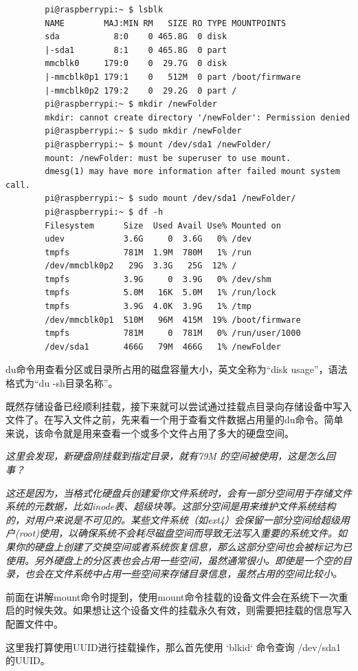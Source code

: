 \documentclass[UTF8]{article}
\begin{document}
	\begin{lstlisting}
		pi@raspberrypi:~ $ lsblk
		NAME        MAJ:MIN RM   SIZE RO TYPE MOUNTPOINTS
		sda           8:0    0 465.8G  0 disk
		|-sda1        8:1    0 465.8G  0 part
		mmcblk0     179:0    0  29.7G  0 disk
		|-mmcblk0p1 179:1    0   512M  0 part /boot/firmware
		|-mmcblk0p2 179:2    0  29.2G  0 part /
		pi@raspberrypi:~ $ mkdir /newFolder
		mkdir: cannot create directory '/newFolder': Permission denied
		pi@raspberrypi:~ $ sudo mkdir /newFolder
		pi@raspberrypi:~ $ mount /dev/sda1 /newFolder/
		mount: /newFolder: must be superuser to use mount.
		dmesg(1) may have more information after failed mount system call.
		pi@raspberrypi:~ $ sudo mount /dev/sda1 /newFolder/
		pi@raspberrypi:~ $ df -h
		Filesystem      Size  Used Avail Use% Mounted on
		udev            3.6G     0  3.6G   0% /dev
		tmpfs           781M  1.9M  780M   1% /run
		/dev/mmcblk0p2   29G  3.3G   25G  12% /
		tmpfs           3.9G     0  3.9G   0% /dev/shm
		tmpfs           5.0M   16K  5.0M   1% /run/lock
		tmpfs           3.9G  4.0K  3.9G   1% /tmp
		/dev/mmcblk0p1  510M   96M  415M  19% /boot/firmware
		tmpfs           781M     0  781M   0% /run/user/1000
		/dev/sda1       466G   79M  466G   1% /newFolder
	\end{lstlisting}
	
	du命令用查看分区或目录所占用的磁盘容量大小，英文全称为“disk usage”，语法格式为“du -sh目录名称”。
	
	既然存储设备已经顺利挂载，接下来就可以尝试通过挂载点目录向存储设备中写入文件了。在写入文件之前，先来看一个用于查看文件数据占用量的du命令。简单来说，该命令就是用来查看一个或多个文件占用了多大的硬盘空间。
	
	\emph{这里会发现，新硬盘刚挂载到指定目录，就有79M 的空间被使用，这是怎么回事？}
	
	\emph{这还是因为，当格式化硬盘兵创建爱你文件系统时，会有一部分空间用于存储文件系统的元数据，比如inode表、超级块等。这部分空间是用来维护文件系统结构的，对用户来说是不可见的。某些文件系统（如ext4）会保留一部分空间给超级用户(root)使用，以确保系统不会耗尽磁盘空间而导致无法写入重要的系统文件。如果你的硬盘上创建了交换空间或者系统恢复信息，那么这部分空间也会被标记为已使用。另外硬盘上的分区表也会占用一些空间，虽然通常很小。即使是一个空的目录，也会在文件系统中占用一些空间来存储目录信息，虽然占用的空间比较小。}
	
	前面在讲解mount命令时提到，使用mount命令挂载的设备文件会在系统下一次重启的时候失效。如果想让这个设备文件的挂载永久有效，则需要把挂载的信息写入配置文件中。
	
	这里我打算使用UUID进行挂载操作，那么首先使用 `blkid` 命令查询 /dev/sda1 的UUID。
	
\end{document}
